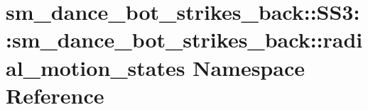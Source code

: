 \hypertarget{namespacesm__dance__bot__strikes__back_1_1SS3_1_1sm__dance__bot__strikes__back_1_1radial__motion__states}{}\section{sm\+\_\+dance\+\_\+bot\+\_\+strikes\+\_\+back\+:\+:S\+S3\+:\+:sm\+\_\+dance\+\_\+bot\+\_\+strikes\+\_\+back\+:\+:radial\+\_\+motion\+\_\+states Namespace Reference}
\label{namespacesm__dance__bot__strikes__back_1_1SS3_1_1sm__dance__bot__strikes__back_1_1radial__motion__states}
